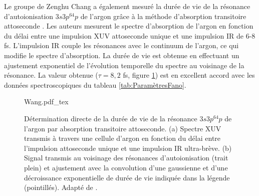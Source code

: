 Le groupe de Zenghu Chang a également mesuré la durée de vie de la résonance d'autoionisation $3s3p^64p$ de l'argon grâce à la méthode d'absorption transitoire attoseconde . Les auteurs mesurent le spectre d'absorption de l'argon en fonction du délai entre une impulsion XUV attoseconde unique et une impulsion IR de 6-8 fs. L'impulsion IR couple les résonances avec le continuum de l'argon, ce qui modifie le spectre d'absorption. La durée de vie est obtenue en effectuant un ajustement exponentiel de l'évolution temporelle du spectre au voisinage de la résonance. La valeur obtenue ($\tau = 8,2$ fs, figure \ref{fig:Wang}) est en excellent accord avec les données spectroscopiques du tableau \ref{tab:ParamètresFano}.

\begin{figure}
\centering
\def\svgwidth{0.9\textwidth}
{Wang.pdf_tex}
\caption{Détermination directe de la durée de vie de la résonance $3s3p^64p$ de l'argon par absorption transitoire attoseconde. (a) Spectre XUV transmis à travers une cellule d'argon en fonction du délai entre l'impulsion attoseconde unique et une impulsion IR ultra-brève. (b) Signal transmis au voisinage des résonances d'autoionisation (trait plein) et ajustement avec la convolution d'une gaussienne et d'une décroissance exponentielle de durée de vie indiquée dans la légende (pointillés). Adapté de .}
\label{fig:Wang}
\end{figure}

